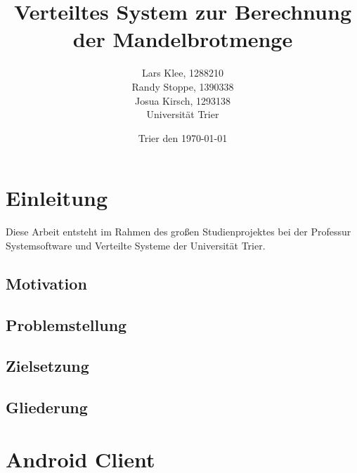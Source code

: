 \documentclass[12pt, onecolumn,notitlepage]{scrartcl}
\begin{document}
\title{Verteiltes System zur Berechnung der Mandelbrotmenge}

\author{Lars Klee, 1288210\\Randy Stoppe, 1390338\\Josua Kirsch, 1293138\\Universität Trier}
\date{Trier den \today}

\newcommand{\define}[1]{\color{darkorange}Definition: \color{black}{#1}\\  } 



\maketitle
\tableofcontents


\section{Einleitung}
Diese Arbeit entsteht im Rahmen des großen Studienprojektes bei der Professur Systemsoftware und Verteilte Systeme der Universität Trier.
\subsection{Motivation}
\subsection{Problemstellung}
\subsection{Zielsetzung}
\subsection{Gliederung}


\section{Android Client}
\end{document}
